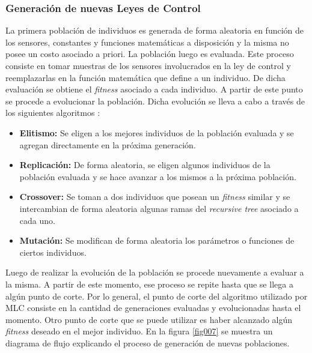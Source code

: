 \documentclass[a4paper,10pt]{article}
\begin{document}
    \subsubsection{Generación de nuevas Leyes de Control} \label{sec:law_gen}
        \indent La primera población de individuos es generada de forma aleatoria en función de los sensores, constantes y funciones
        matemáticas a disposición y la misma no posee un costo asociado a priori. La población luego es evaluada. Este proceso consiste en 
        tomar muestras de los sensores involucrados en la ley de control y reemplazarlas en la función matemática que define a un 
        individuo. De dicha evaluación se obtiene el \textit{fitness} asociado a cada individuo. A partir de
        este punto se procede a evolucionar la población. Dicha evolución se lleva a cabo a través de los siguientes algoritmos
        \cite{Duriez2016}:

        \begin{itemize}
            \item \textbf{Elitismo:} Se eligen a los mejores individuos de la población evaluada y se agregan directamente en la próxima
            generación.
            \item \textbf{Replicación:} De forma aleatoria, se eligen algunos individuos de la población evaluada y se hace avanzar a los
            mismos a la próxima población.
        \item \textbf{Crossover:} Se toman a dos individuos que posean un \textit{fitness} similar y se intercambian de forma aleatoria
            algunas ramas del \textit{recursive tree} asociado a cada uno.
            \item \textbf{Mutación:} Se modifican de forma aleatoria los parámetros o funciones de ciertos individuos.
        \end{itemize}

        Luego de realizar la evolución de la población se procede nuevamente a evaluar a la misma. A partir de este momento, ese proceso
        se repite hasta que se llega a algún punto de corte. Por lo general, el punto de corte del algoritmo utilizado por MLC consiste
        en la cantidad de generaciones evaluadas y evolucionadas hasta el momento. Otro punto de corte que se puede utilizar es haber
        alcanzado algún \textit{fitness} deseado en el mejor individuo. En la figura \ref{fig007} se muestra un diagrama de flujo
        explicando el proceso de generación de nuevas poblaciones.
\end{document}
